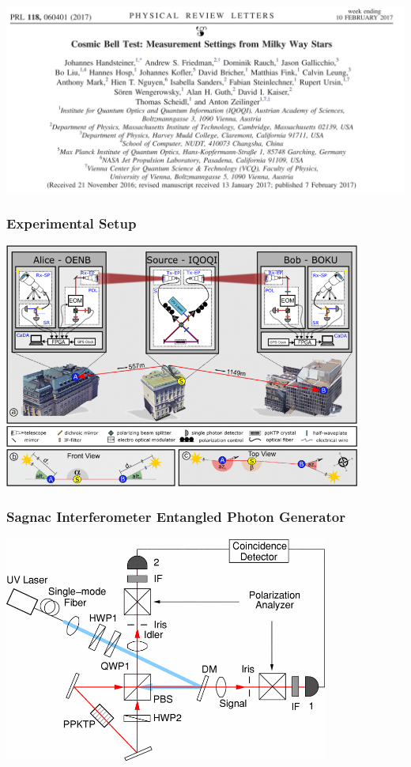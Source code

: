 \documentclass{beamer}
\begin{document}
\begin{frame}\frametitle{}
    \centering
    \includegraphics[width=1.0\textwidth]{Images/Paper_Title.png}
\end{frame}

\begin{frame}\frametitle{Experimental Setup}
    \centering
    \includegraphics[width=0.88\textwidth]{Images/Exp_Setup.png}

    \cite{Handsteiner2016}
\end{frame}

\begin{frame}\frametitle{Sagnac Interferometer Entangled Photon Generator}
    \centering
    \includegraphics[width=0.8\textwidth]{Images/Sagnac.png}

    \cite{Kim2006}
\end{frame}
\end{document}
